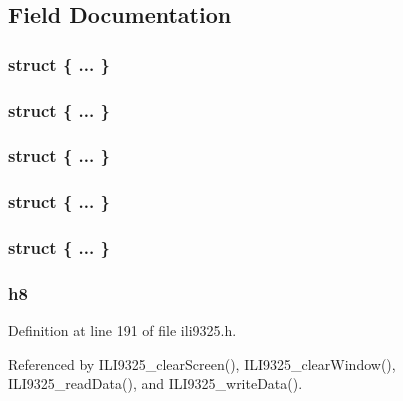 \subsection{Field Documentation}
\hypertarget{unionword__t_ad2d2c241ee3b46b3c23cde7c981178eb}{\subsubsection[{"@10}]{\setlength{\rightskip}{0pt plus 5cm}struct \{ ... \} }}\label{unionword__t_ad2d2c241ee3b46b3c23cde7c981178eb}
\hypertarget{unionword__t_a9606fb80138ef896fa24e95c3d00cbbb}{\subsubsection[{"@40}]{\setlength{\rightskip}{0pt plus 5cm}struct \{ ... \} }}\label{unionword__t_a9606fb80138ef896fa24e95c3d00cbbb}
\hypertarget{unionword__t_abaa9deba733338b10ab9f4ff6715d230}{\subsubsection[{"@43}]{\setlength{\rightskip}{0pt plus 5cm}struct \{ ... \} }}\label{unionword__t_abaa9deba733338b10ab9f4ff6715d230}
\hypertarget{unionword__t_ac1b62c52744566f20f3147e50b7346d1}{\subsubsection[{"@5}]{\setlength{\rightskip}{0pt plus 5cm}struct \{ ... \} }}\label{unionword__t_ac1b62c52744566f20f3147e50b7346d1}
\hypertarget{unionword__t_a975583328a97634d272f08b211778dda}{\subsubsection[{"@8}]{\setlength{\rightskip}{0pt plus 5cm}struct \{ ... \} }}\label{unionword__t_a975583328a97634d272f08b211778dda}
\hypertarget{unionword__t_adcad4dc69be4c39d2fb6307f0cb97ac1}{
\subsubsection[{h8}]{ h8}}\label{unionword__t_adcad4dc69be4c39d2fb6307f0cb97ac1}


Definition at line 191 of file ili9325.\-h.



Referenced by I\-L\-I9325\-\_\-clear\-Screen(), I\-L\-I9325\-\_\-clear\-Window(), I\-L\-I9325\-\_\-read\-Data(), and I\-L\-I9325\-\_\-write\-Data().

